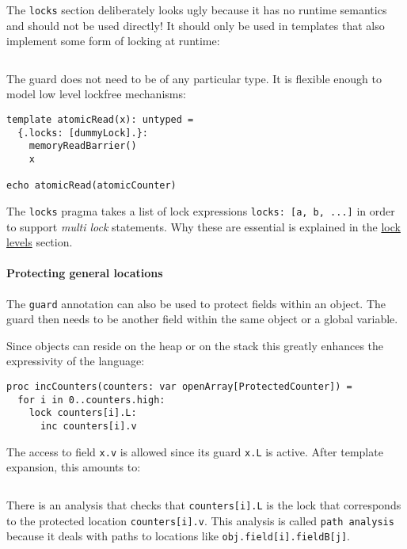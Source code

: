 The \texttt{locks} section deliberately looks ugly because it has no
runtime semantics and should not be used directly! It should only be
used in templates that also implement some form of locking at runtime:

\begin{verbatim}
\end{verbatim}

The guard does not need to be of any particular type. It is flexible
enough to model low level lockfree mechanisms:

\begin{verbatim}
template atomicRead(x): untyped =
  {.locks: [dummyLock].}:
    memoryReadBarrier()
    x

echo atomicRead(atomicCounter)
\end{verbatim}

The \texttt{locks} pragma takes a list of lock expressions
\texttt{locks:\ {[}a,\ b,\ ...{]}} in order to support \emph{multi lock}
statements. Why these are essential is explained in the
\protect\hyperlink{guards-and-locks-lock-levels}{lock levels} section.

\hypertarget{protecting-general-locations}{%
\paragraph{Protecting general
locations}\label{protecting-general-locations}}

The \texttt{guard} annotation can also be used to protect fields within
an object. The guard then needs to be another field within the same
object or a global variable.

Since objects can reside on the heap or on the stack this greatly
enhances the expressivity of the language:

\begin{verbatim}
proc incCounters(counters: var openArray[ProtectedCounter]) =
  for i in 0..counters.high:
    lock counters[i].L:
      inc counters[i].v
\end{verbatim}

The access to field \texttt{x.v} is allowed since its guard \texttt{x.L}
is active. After template expansion, this amounts to:

\begin{verbatim}
\end{verbatim}

There is an analysis that checks that \texttt{counters{[}i{]}.L} is the
lock that corresponds to the protected location
\texttt{counters{[}i{]}.v}. This analysis is called
\texttt{path\ analysis} because it deals with paths to locations like
\texttt{obj.field{[}i{]}.fieldB{[}j{]}}.

